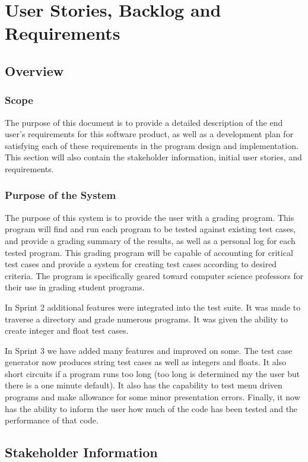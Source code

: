 \chapter{User Stories, Backlog and Requirements}
\section{Overview}

\subsection{Scope}
The purpose of this document is to provide a detailed description of the end user's requirements
for this software product, as well as a development plan for satisfying each of these requirements
in the program design and implementation.  This section will also contain the stakeholder information, 
initial user stories, and requirements. 

\subsection{Purpose of the System}
The purpose of this system is to provide the user with a grading program.  This program will find and run each program to be tested against existing test cases, and provide a grading summary of the results, as well as a personal log for each tested program.  This grading program will be capable of accounting for critical test cases and provide a system for creating test cases according to desired criteria. The program is specifically geared toward computer science professors for their use in grading student programs.

In Sprint 2 additional features were integrated into the test suite. It was made to traverse a directory and grade numerous programs. It was given the ability to create integer and float test cases.

In Sprint 3 we have added many features and improved on some. The test case generator now produces string test cases as well as integers and floats. It also short circuits if a program runs too long (too long is determined my the user but there is a one minute default). It also has the capability to test menu driven programs and make allowance for some minor presentation errors. Finally, it now has the ability to inform the user how much of the code has been tested and the performance of that code.


\section{ Stakeholder Information}

